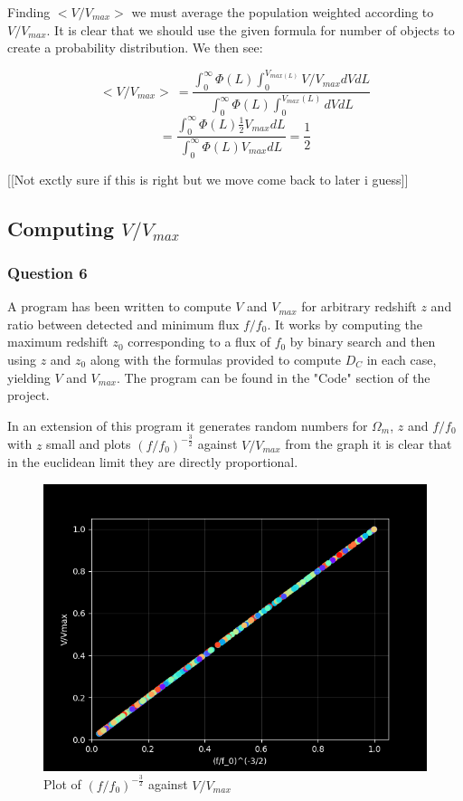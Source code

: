 \documentclass{article}
\begin{document}
Finding $<V/V_{max}>$ we must average the population weighted according to $V/V_{max}$. It is clear that we should use the given formula for number of objects to create a probability distribution. We then see:

$$<V/V_{max}>\ = \frac{\int_0^\infty \Phi(L) \int_0^{V_{max(L)}} V/V_{max}dVdL}{\int_0^\infty \Phi(L) \int_0^{V_{max}(L)}dVdL}$$
$$= \frac{\int_0^\infty \Phi(L) \frac{1}{2}V_{max}dL}{\int_0^\infty \Phi(L) V_{max}dL} = \frac{1}{2}$$

[[Not exctly sure if this is right but we move come back to later i guess]]

\subsection{Computing $V/V_{max}$}
\subsubsection{Question 6}
A program has been written to compute $V$ and $V_{max}$ for arbitrary redshift $z$ and ratio between detected and minimum flux $f/f_0$. It works by computing the maximum redshift $z_0$
corresponding to a flux of $f_0$ by binary search and then using $z$ and $z_0$ along with the formulas provided to compute $D_C$ in each case, yielding $V$ and $V_{max}$.
The program can be found in the "Code" section of the project.

\vspace{5mm}
In an extension of this program it generates random numbers for $\Omega_m$, $z$ and $f/f_0$ with $z$ small and plots $(f/f_0)^{-\frac{3}{2}}$ against $V/V_{max}$ from the graph it is clear that in the euclidean limit they are directly proportional.

\begin{figure}[ht!]
	\includegraphics[width=\textwidth]{EuclideanLimit.png}
	\caption{Plot of $(f/f_0)^{-\frac{3}{2}}$ against $V/V_{max}$}
\end{figure}
\end{document}
